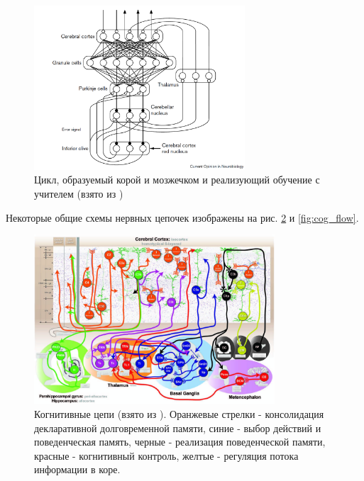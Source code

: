 \documentclass[12pt]{report}
\begin{document}
	\begin{figure}
		\centering
		\includegraphics[width=0.7\textwidth]{misc/phisio/doya_cortico-cerebr}
		\caption{Цикл, образуемый корой и мозжечком и реализующий обучение с учителем (взято из \cite{Doya2000a})}
		\label{fig:doya_cortcer}		
	\end{figure}
	
	Некоторые общие схемы нервных цепочек изображены на рис. \ref{fig:cog_circ} и \ref{fig:cog_flow}.
	
	\begin{figure}
		\centering
		\includegraphics[width=0.8\textwidth]{misc/phisio/cognitive_circuits}
		\caption{Когнитивные цепи (взято из \cite{Solari2011}). Оранжевые стрелки - консолидация декларативной долговременной памяти, синие - выбор действий и поведенческая память, черные - реализация поведенческой памяти, красные - когнитивный контроль, желтые - регуляция потока информации в коре.}
		\label{fig:cog_circ}		
	\end{figure}
\end{document}
